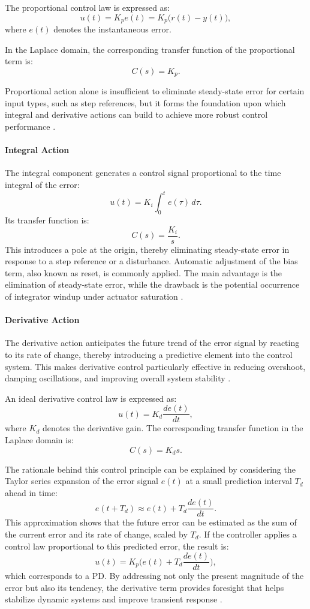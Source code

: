 The proportional control law is expressed as:
\[
u(t) = K_p e(t) = K_p \bigl( r(t) - y(t) \bigr),
\]  
where $e(t)$ denotes the instantaneous error.  

In the Laplace domain, the corresponding transfer function of the proportional term is:
\[
C(s) = K_p.
\]  

Proportional action alone is insufficient to eliminate steady-state error for certain input types, such as step references, but it forms the foundation upon which integral and derivative actions can build to achieve more robust control performance \cite[see][3-4]{Visioli:2006}.

\paragraph{Integral Action}  
The integral component generates a control signal proportional to the time integral of the error:
\[
u(t) = K_i \int_{0}^{t} e(\tau)\, d\tau.
\]  
Its transfer function is:
\[
C(s) = \frac{K_i}{s}.
\]  
This introduces a pole at the origin, thereby eliminating steady-state error in response to a step reference or a disturbance. Automatic adjustment of the bias term, also known as reset, is commonly applied. The main advantage is the elimination of steady-state error, while the drawback is the potential occurrence of integrator windup under actuator saturation \cite[see][5]{Visioli:2006}.

\paragraph{Derivative Action}  
The derivative action anticipates the future trend of the error signal by reacting to its rate of change, thereby introducing a predictive element into the control system. This makes derivative control particularly effective in reducing overshoot, damping oscillations, and improving overall system stability \cite[see][6]{Visioli:2006}.  

An ideal derivative control law is expressed as:
\[
u(t) = K_d \frac{de(t)}{dt},
\]
where \(K_d\) denotes the derivative gain. The corresponding transfer function in the Laplace domain is:
\[
C(s) = K_d s.
\]

The rationale behind this control principle can be explained by considering the Taylor series expansion of the error signal \(e(t)\) at a small prediction interval \(T_d\) ahead in time:
\[
e(t + T_d) \approx e(t) + T_d \frac{de(t)}{dt}.
\]
This approximation shows that the future error can be estimated as the sum of the current error and its rate of change, scaled by \(T_d\). If the controller applies a control law proportional to this predicted error, the result is:
\[
u(t) = K_p \Biggl( e(t) + T_d \frac{de(t)}{dt} \Biggr),
\]
which corresponds to a \ac{PD}. By addressing not only the present magnitude of the error but also its tendency, the derivative term provides foresight that helps stabilize dynamic systems and improve transient response \cite[see][6]{Visioli:2006}.


